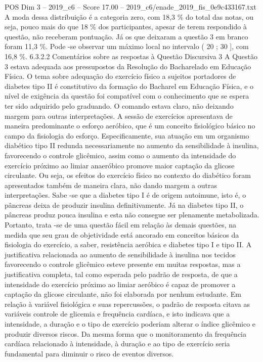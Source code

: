 \begin{textsample}{POS Dim 3 – 2019\_c6 – Score 17.00 – 2019\_c6/enade\_2019\_fis\_0e9c433167.txt}
A moda dessa distribuição é a categoria zero, com 18,3 \% do total das notas, ou seja, pouco mais do que 18 \% dos participantes, apesar de terem respondido à questão, não receberam pontuação.
Já os que deixaram a questão 3 em branco foram 11,3 \%.
Pode -se observar um máximo local no intervalo ( 20 ; 30 ], com 16,8 \%. 6.3.2.2 Comentários sobre as respostas à Questão Discursiva 3 A Questão 3 estava adequada aos pressupostos da Resolução do Bacharelado em Educação Física.
O tema sobre adequação do exercício físico a sujeitos portadores de diabetes tipo II é constitutivo da formação do Bacharel em Educação Física, e o nível de exigência da questão foi compatível com o conhecimento que se espera ter sido adquirido pelo graduando.
O comando estava claro, não deixando margem para outras interpretações.
A sessão de exercícios apresentava de maneira predominante o esforço aeróbico, que é um conceito fisiológico básico no campo da fisiologia do esforço.
Especificamente, sua atuação em um organismo diabético tipo II redunda necessariamente no aumento da sensibilidade à insulina, favorecendo o controle glicêmico, assim como o aumento da intensidade do exercício próximo ao limiar anaeróbico promove maior captação da glicose circulante.
Ou seja, os efeitos do exercício físico no contexto do diabético foram apresentados também de maneira clara, não dando margem a outras interpretações.
Sabe -se que a diabetes tipo I é de origem autoimune, isto é, o pâncreas deixa de produzir insulina definitivamente.
Já na diabetes tipo II, o pâncreas produz pouca insulina e esta não consegue ser plenamente metabolizada.
Portanto, trata -se de uma questão fácil em relação às demais questões, na medida que seu grau de objetividade está ancorado em conceitos básicos da fisiologia do exercício, a saber, resistência aeróbica e diabetes tipo I e tipo II.
A justificativa relacionada ao aumento de sensibilidade à insulina nos tecidos favorecendo o controle glicêmico esteve presente em muitas respostas, mas a justificativa completa, tal como esperada pelo padrão de resposta, de que a intensidade do exercício próximo ao limiar aeróbico é capaz de promover a captação da glicose circulante, não foi elaborada por nenhum estudante.
Em relação à variável fisiológica e suas repercussões, o padrão de resposta citava as variáveis controle de glicemia e frequência cardíaca, e isto indicava que a intensidade, a duração e o tipo de exercício poderiam alterar o índice glicêmico e produzir diversos riscos.
Da mesma forma que o monitoramento da frequência cardíaca relacionado à intensidade, à duração e ao tipo de exercício seria fundamental para diminuir o risco de eventos diversos.

\end{textsample}
